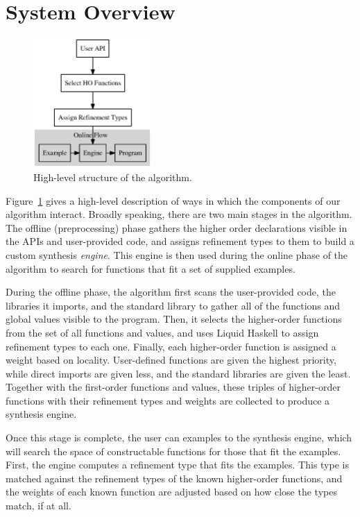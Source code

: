 \section{System Overview}

\begin{figure}[t]
  \centering
  \includegraphics[width=0.4\textwidth]{algo}
  \caption{High-level structure of the algorithm.}
  \label{fig:high_level_overview}
\end{figure}

Figure~\ref{fig:high_level_overview} gives a high-level description of ways in which the components of our algorithm interact. Broadly speaking, there are two main stages in the algorithm. The offline (preprocessing) phase gathers the higher order declarations visible in the APIs and user-provided code, and assigns refinement types to them to build a custom synthesis \textit{engine}. This engine is then used during the online phase of the algorithm to search for functions that fit a set of supplied examples.

During the offline phase, the algorithm first scans the user-provided code, the libraries it imports, and the standard library to gather all of the functions and global values visible to the program. Then, it selects the higher-order functions from the set of all functions and values, and uses Liquid Haskell \cite{DBLP:conf/haskell/VazouSJ14, DBLP:conf/esop/VazouRJ13, DBLP:conf/icfp/VazouSJVJ14} to assign refinement types to each one. Finally, each higher-order function is assigned a weight based on locality\cite{DBLP:conf/pldi/GveroKKP13}. User-defined functions are given the highest priority, while direct imports are given less, and the standard libraries are given the least. Together with the first-order functions and values, these triples of higher-order functions with their refinement types and weights are collected to produce a synthesis engine.

Once this stage is complete, the user can examples to the synthesis engine, which will search the space of constructable functions for those that fit the examples. First, the engine computes a refinement type that fits the examples. This type is matched against the refinement types of the known higher-order functions, and the weights of each known function are adjusted based on how close the types match, if at all.

